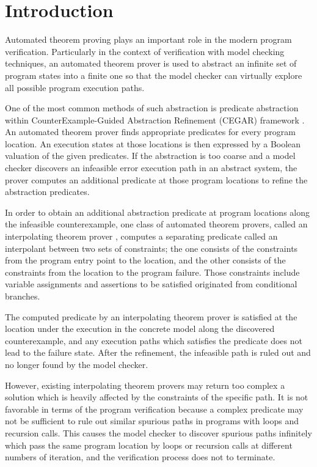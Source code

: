 \chapter{Introduction}

Automated theorem proving plays an important role in the modern
program verification.  Particularly in the context of verification
with model checking techniques, an automated theorem prover is used to
abstract an infinite set of program states into a finite one so that
the model checker can virtually explore all possible program execution
paths.

One of the most common methods of such abstraction is predicate
abstraction\cite{conf/cav/GrafS97} within CounterExample-Guided
Abstraction Refinement (CEGAR) framework
\cite{conf/cav/ClarkeGJLV00,conf/popl/BallR02,conf/popl/HenzingerJMS02}.
An automated theorem prover finds appropriate predicates for every
program location.  An execution states at those locations is then
expressed by a Boolean valuation of the given predicates.  If the
abstraction is too coarse and a model checker discovers an infeasible
error execution path in an abstract system, the prover computes an
additional predicate at those program locations to refine the
abstraction predicates.

In order to obtain an additional abstraction predicate at program
locations along the infeasible counterexample, one class of automated
theorem provers, called an interpolating theorem prover
\cite{journals/tcs/McMillan05,conf/vmcai/RybalchenkoS07}, computes a
separating predicate called an interpolant between two sets of
constraints; the one consists of the constraints from the program
entry point to the location, and the other consists of the constraints
from the location to the program failure.  Those constraints include
variable assignments and assertions to be satisfied originated from
conditional branches.

The computed predicate by an interpolating theorem prover is satisfied
at the location under the execution in the concrete model along the
discovered counterexample, and any execution paths which satisfies the
predicate does not lead to the failure state.  After the refinement,
the infeasible path is ruled out and no longer found by the model
checker.

However, existing interpolating theorem provers may return too complex
a solution which is heavily affected by the constraints of the
specific path.  It is not favorable in terms of the program
verification because a complex predicate may not be sufficient to rule
out similar spurious paths in programs with loops and recursion calls.
This causes the model checker to discover spurious paths infinitely
which pass the same program location by loops or recursion calls at
different numbers of iteration, and the verification process does not
to terminate.


